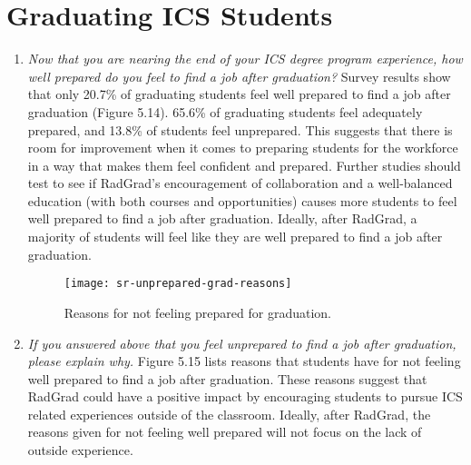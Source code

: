 \section{Graduating ICS Students}
\begin{enumerate}
\begin{figure}[h]
\centering
\texttt{[image: sr-prepared]}
\caption{Results for graduation preparedness.}
\end{figure}
\item \textit{Now that you are nearing the end of your ICS degree program experience, how well prepared do you feel to find a job after graduation?}
Survey results show that only 20.7\% of graduating students feel well prepared to find a job after graduation (Figure 5.14). 65.6\% of graduating students feel adequately prepared, and 13.8\% of students feel unprepared. This suggests that there is room for improvement when it comes to preparing students for the workforce in a way that makes them feel confident and prepared. Further studies should test to see if RadGrad's encouragement of collaboration and a well-balanced education (with both courses and opportunities) causes more students to feel well prepared to find a job after graduation. Ideally, after RadGrad, a majority of students will feel like they are well prepared to find a job after graduation. 
\begin{figure}[h]
\centering
\texttt{[image: sr-unprepared-grad-reasons]}
\caption{Reasons for not feeling prepared for graduation.}
\end{figure}
\item \textit{If you answered above that you feel unprepared to find a job after graduation, please explain why. }
Figure 5.15 lists reasons that students have for not feeling well prepared to find a job after graduation. These reasons suggest that RadGrad could have a positive impact by encouraging students to pursue ICS related experiences outside of the classroom. Ideally, after RadGrad, the reasons given for not feeling well prepared will not focus on the lack of outside experience. 
\end{enumerate}



